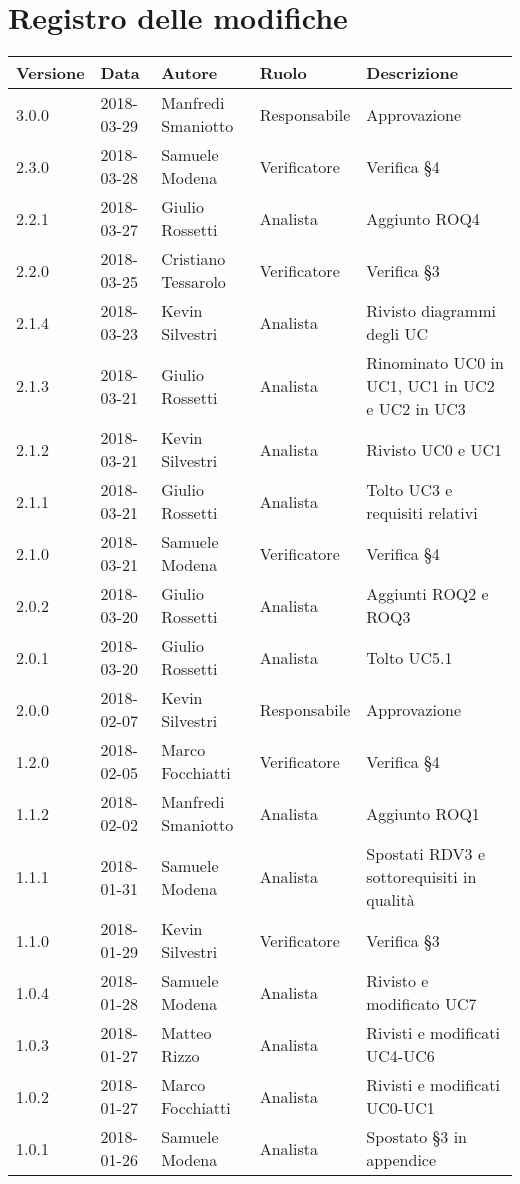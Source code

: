 \documentclass[./AnalisideiRequisiti.tex]{subfiles}
\begin{document}
	
{
	\chapter*{Registro delle modifiche}
\setlength\LTleft{-22mm}
	\begin{longtable}{|p{20mm}|p{20mm}|p{40mm}|p{30mm}|p{50mm}|}
		\hline
		\textbf{Versione} & \textbf{Data} & \textbf{Autore} & \textbf{Ruolo} & \textbf{Descrizione} \\ \hline 
		    
		3.0.0 & 2018-03-29 & Manfredi Smaniotto & Responsabile & Approvazione\\ \hline 
		2.3.0 & 2018-03-28 & Samuele Modena & Verificatore & Verifica §4\\ \hline 		
		2.2.1 & 2018-03-27 & Giulio Rossetti & Analista & Aggiunto ROQ4\\ \hline 
		2.2.0 & 2018-03-25 & Cristiano Tessarolo & Verificatore & Verifica §3\\ \hline 
		2.1.4 & 2018-03-23 & Kevin Silvestri & Analista & Rivisto diagrammi degli UC\\ \hline
		2.1.3 & 2018-03-21 & Giulio Rossetti & Analista & Rinominato UC0 in UC1, UC1 in UC2 e UC2 in UC3\\ \hline
		2.1.2 & 2018-03-21 & Kevin Silvestri & Analista & Rivisto UC0 e UC1\\ \hline
		2.1.1 & 2018-03-21 & Giulio Rossetti & Analista & Tolto UC3 e requisiti relativi\\ \hline
		2.1.0 & 2018-03-21 & Samuele Modena & Verificatore & Verifica §4\\ \hline
		2.0.2 & 2018-03-20 & Giulio Rossetti & Analista & Aggiunti ROQ2 e ROQ3\\ \hline
		2.0.1 & 2018-03-20 & Giulio Rossetti & Analista & Tolto UC5.1\\ \hline
		
		2.0.0 & 2018-02-07 & Kevin Silvestri & Responsabile & Approvazione\\ \hline 
		1.2.0 & 2018-02-05 & Marco Focchiatti & Verificatore & Verifica §4\\ \hline    
		1.1.2 & 2018-02-02 & Manfredi Smaniotto & Analista & Aggiunto ROQ1\\ \hline 
		1.1.1 & 2018-01-31 & Samuele Modena & Analista & Spostati RDV3 e sottorequisiti in qualità\\ \hline  
		1.1.0 & 2018-01-29 & Kevin Silvestri & Verificatore & Verifica §3\\ \hline  
		1.0.4 & 2018-01-28 & Samuele Modena & Analista & Rivisto e modificato UC7\\ \hline  
		1.0.3 & 2018-01-27 & Matteo Rizzo & Analista & Rivisti e modificati UC4-UC6\\ \hline    
		1.0.2 & 2018-01-27 & Marco Focchiatti & Analista & Rivisti e modificati UC0-UC1\\ \hline  
		1.0.1 & 2018-01-26 & Samuele Modena & Analista & Spostato §3 in appendice\\ \hline
		

\end{longtable}}
\end{document}
